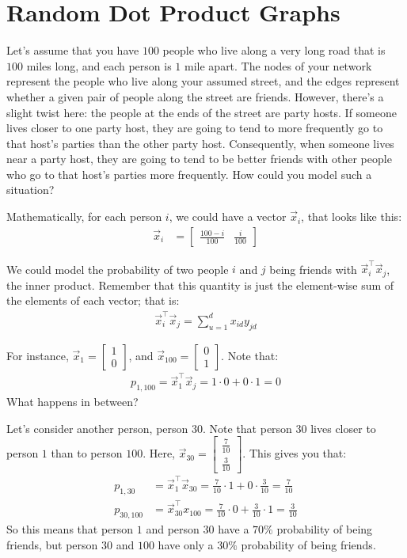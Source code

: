 \section{Random Dot Product Graphs}
\label{sec:ch5:rdpg}

Let's assume that you have $100$ people who live along a very long road that is $100$ miles long, and each person is $1$ mile apart. The nodes of your network represent the people who live along your assumed street, and the edges represent whether a given pair of people along the street are friends. However, there's a slight twist here: the people at the ends of the street are party hosts. If someone lives closer to one party host, they are going to tend to more frequently go to that host's parties than the other party host. Consequently, when someone lives near a party host, they are going to tend to be better friends with other people who go to that host's parties more frequently. How could you model such a situation?

Mathematically, for each person $i$, we could have a vector $\vec x_i$, that looks like this:
\begin{align*}
    \vec x_i &= \begin{bmatrix}
        \frac{100 - i}{100} & \frac{i}{100}
    \end{bmatrix}
\end{align*}

We could model the probability of two people $i$ and $j$ being friends with $\vec x_i^\top \vec x_j$, the inner product. Remember that this quantity is just the element-wise sum of the elements of each vector; that is:
\begin{align*}
    \vec x_i^\top \vec x_j = \sum_{u = 1}^d x_{id}y_{jd}
\end{align*}

For instance, $\vec x_1 = \begin{bmatrix}1 \\ 0\end{bmatrix}$, and $\vec x_{100} = \begin{bmatrix} 0 \\ 1\end{bmatrix}$. Note that:
\begin{align*}
p_{1,100} = \vec x_1^\top \vec x_j = 1 \cdot 0 + 0 \cdot 1 = 0
\end{align*}
What happens in between?

Let's consider another person, person $30$. Note that person $30$ lives closer to person $1$ than to person $100$.  Here, $\vec x_{30} = \begin{bmatrix} \frac{7}{10}\\ \frac{3}{10}\end{bmatrix}$. This gives you that:
\begin{align*}
p_{1,30} &= \vec x_1^\top \vec x_{30} = \frac{7}{10}\cdot 1 + 0 \cdot \frac{3}{10} = \frac{7}{10} \\
p_{30, 100} &= \vec x_{30}^\top x_{100} = \frac{7}{10} \cdot 0 + \frac{3}{10} \cdot 1 = \frac{3}{10}
\end{align*}
So this means that person $1$ and person $30$ have a $70\%$ probability of being friends, but person $30$ and $100$ have only a $30\%$ probability of being friends.


